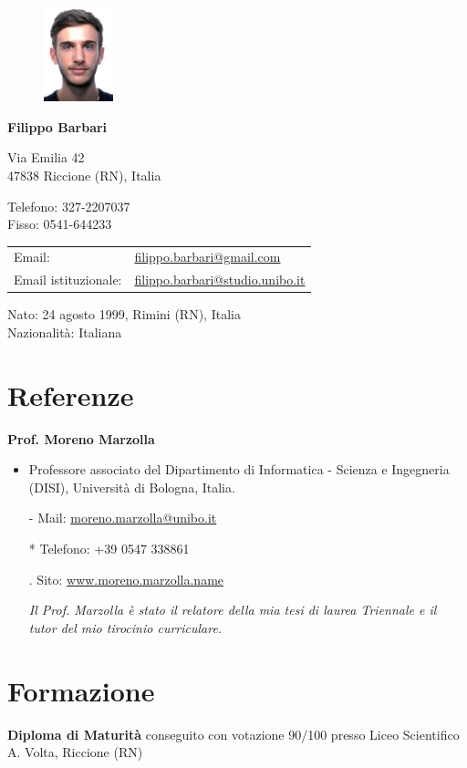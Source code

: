 \documentclass{article}
\newcommand{\years}[1]{\marginnote{\small #1}} %
\newcommand{\referenza}[6]{
	\textbf{#1}
	\begin{itemize}
		\setlength\itemsep{0em}
		\item #2
		\item[-] Mail: #3
		\item[*] Telefono: #4
		\item[.] Sito: #5
		\item[] \textit{#6}
	\end{itemize}
}
\begin{document}
	
	\begin{figure}
		\includegraphics[width=0.18\textwidth]{fototessera}
	\end{figure}
		
	{\LARGE\bfseries Filippo Barbari} %
	\bigskip
	
	Via Emilia 42\\ %
	47838 Riccione (RN), Italia
	\medskip %
	
	Telefono: 327-2207037\\
	Fisso: 0541-644233
	\medskip
	
	\noindent
	\begin{tabular}{ll}
		Email: & \href{mailto:filippo.barbari@gmail.com}{filippo.barbari@gmail.com}\\
		Email istituzionale: & \href{mailto:filippo.barbari@studio.unibo.it}{filippo.barbari@studio.unibo.it}
	\end{tabular}
	\medskip
	
	Nato: 24 agosto 1999, Rimini (RN), Italia\\ %
	Nazionalità: Italiana %
	
	\section*{Referenze}
	
	\referenza{Prof. Moreno Marzolla}
	{Professore associato del Dipartimento di Informatica - Scienza e Ingegneria (DISI), Università di Bologna, Italia.}
	{\href{mailto:moreno.marzolla@unibo.it}{moreno.marzolla@unibo.it}}
	{+39 0547 338861}
	{\href{https://www.moreno.marzolla.name}{www.moreno.marzolla.name}}
	{\textit{Il Prof. Marzolla è stato il relatore della mia tesi di laurea Triennale e il tutor del mio tirocinio curriculare.}}
	
	\section*{Formazione}
	\years{2013-2018} \textbf{Diploma di Maturità} conseguito con votazione 90/100 presso Liceo Scientifico A. Volta, Riccione (RN)\\
	
\end{document}
